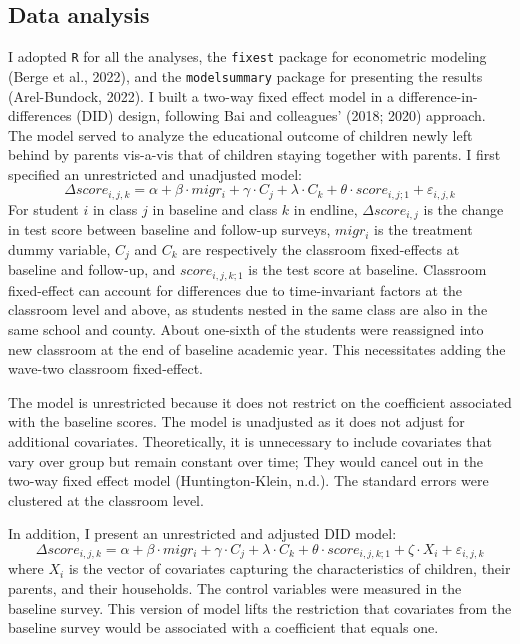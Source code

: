 \documentclass[
  man,floatsintext]{apa7}
\begin{document}
\hypertarget{data-analysis}{%
\subsection{Data analysis}\label{data-analysis}}

I adopted \texttt{R} for all the analyses, the \texttt{fixest} package for econometric modeling (Berge et al., 2022), and the \texttt{modelsummary} package for presenting the results (Arel-Bundock, 2022). I built a two-way fixed effect model in a difference-in-differences (DID) design, following Bai and colleagues' (2018; 2020) approach. The model served to analyze the educational outcome of children newly left behind by parents vis-a-vis that of children staying together with parents. I first specified an unrestricted and unadjusted model: \[\Delta score_{i,j,k} = \alpha + \beta \cdot migr_{i} + \gamma \cdot C_{j} + \lambda \cdot C_{k} + \theta \cdot score_{i,j;1} + \varepsilon_{i,j,k}\] For student \(i\) in class \(j\) in baseline and class \(k\) in endline, \(\Delta score_{i,j}\) is the change in test score between baseline and follow-up surveys, \(migr_{i}\) is the treatment dummy variable, \(C_{j}\) and \(C_{k}\) are respectively the classroom fixed-effects at baseline and follow-up, and \(score_{i,j,k;1}\) is the test score at baseline. Classroom fixed-effect can account for differences due to time-invariant factors at the classroom level and above, as students nested in the same class are also in the same school and county. About one-sixth of the students were reassigned into new classroom at the end of baseline academic year. This necessitates adding the wave-two classroom fixed-effect.

The model is unrestricted because it does not restrict on the coefficient associated with the baseline scores. The model is unadjusted as it does not adjust for additional covariates. Theoretically, it is unnecessary to include covariates that vary over group but remain constant over time; They would cancel out in the two-way fixed effect model (Huntington-Klein, n.d.). The standard errors were clustered at the classroom level.

In addition, I present an unrestricted and adjusted DID model: \[\Delta score_{i,j,k} = \alpha + \beta \cdot migr_{i} + \gamma \cdot C_{j} + \lambda \cdot C_{k} + \theta \cdot score_{i,j,k;1} + \zeta \cdot X_{i} + \varepsilon_{i,j,k}\] where \(X_{i}\) is the vector of covariates capturing the characteristics of children, their parents, and their households. The control variables were measured in the baseline survey. This version of model lifts the restriction that covariates from the baseline survey would be associated with a coefficient that equals one.
\end{document}
